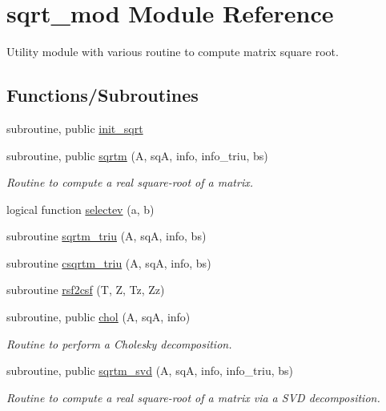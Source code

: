 \hypertarget{namespacesqrt__mod}{}\section{sqrt\+\_\+mod Module Reference}
\label{namespacesqrt__mod}


Utility module with various routine to compute matrix square root.  


\subsection*{Functions/\+Subroutines}
\begin{DoxyCompactItemize}
\item 
subroutine, public \hyperlink{namespacesqrt__mod_ab0108c0f48903dcc961e731c0ccb55d8}{init\+\_\+sqrt}
\item 
subroutine, public \hyperlink{namespacesqrt__mod_a6da01b705b42190ac5b629e9267b0506}{sqrtm} (A, sqA, info, info\+\_\+triu, bs)
\begin{DoxyCompactList}\small\item\em Routine to compute a real square-\/root of a matrix. \end{DoxyCompactList}\item 
logical function \hyperlink{namespacesqrt__mod_a8789d2f86087703a058918101999894f}{selectev} (a, b)
\item 
subroutine \hyperlink{namespacesqrt__mod_a0bce77dc166341fedad843599efd43c7}{sqrtm\+\_\+triu} (A, sqA, info, bs)
\item 
subroutine \hyperlink{namespacesqrt__mod_a7ed927e15fad09a188abebe860651125}{csqrtm\+\_\+triu} (A, sqA, info, bs)
\item 
subroutine \hyperlink{namespacesqrt__mod_a322dc68a48c31785fb167134331e21e3}{rsf2csf} (T, Z, Tz, Zz)
\item 
subroutine, public \hyperlink{namespacesqrt__mod_a6dd33ec6afedb4b752026bba20204f2c}{chol} (A, sqA, info)
\begin{DoxyCompactList}\small\item\em Routine to perform a Cholesky decomposition. \end{DoxyCompactList}\item 
subroutine, public \hyperlink{namespacesqrt__mod_a99d44e5fd3e8203544db6a8331e38828}{sqrtm\+\_\+svd} (A, sqA, info, info\+\_\+triu, bs)
\begin{DoxyCompactList}\small\item\em Routine to compute a real square-\/root of a matrix via a S\+VD decomposition. \end{DoxyCompactList}\end{DoxyCompactItemize}
